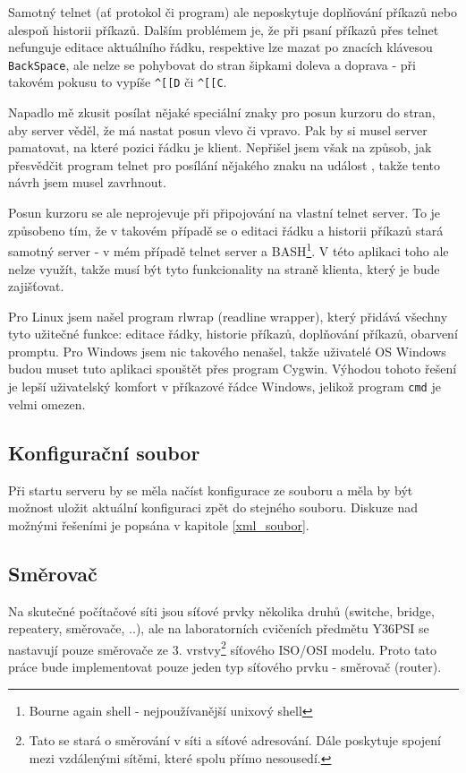 Samotný telnet (ať protokol či program) ale neposkytuje doplňování příkazů nebo alespoň historii příkazů. Dalším problémem je, že při psaní příkazů přes telnet nefunguje editace aktuálního řádku, respektive lze mazat po znacích klávesou \verb|BackSpace|, ale nelze se pohybovat do stran šipkami doleva a doprava - při takovém pokusu to vypíše \verb|^[[D| či \verb|^[[C|. 

Napadlo mě zkusit posílat nějaké speciální znaky pro posun kurzoru do stran, aby server věděl, že má nastat posun vlevo či vpravo. Pak by si musel server pamatovat, na které pozici řádku je klient. Nepřišel jsem však na způsob, jak přesvědčit program telnet pro posílání nějakého znaku na událost , takže tento návrh jsem musel zavrhnout.

Posun kurzoru se ale neprojevuje při připojování na vlastní telnet server. To je způsobeno tím, že v takovém případě se o editaci řádku a historii příkazů stará samotný server - v mém případě telnet server a BASH\footnote{Bourne again shell - nejpoužívanější unixový shell}. V této aplikaci toho ale nelze využít, takže musí být tyto funkcionality na straně klienta, který je bude zajišťovat. 

Pro Linux jsem našel program rlwrap (readline wrapper), který přidává všechny tyto užitečné funkce: editace řádky, historie příkazů, doplňování příkazů, obarvení promptu. Pro Windows jsem nic takového nenašel, takže uživatelé OS Windows budou muset tuto aplikaci spouštět přes program Cygwin. Výhodou tohoto řešení je lepší uživatelský komfort v příkazové řádce Windows, jelikož program \verb|cmd| je velmi omezen.


\subsection{Konfigurační soubor}
Při startu serveru by se měla načíst konfigurace ze souboru a měla by být možnost uložit aktuální konfiguraci zpět do stejného souboru. Diskuze nad možnými řešeními je popsána v kapitole \ref{xml_soubor}.


\subsection{Směrovač}
Na skutečné počítačové síti jsou síťové prvky několika druhů (switche, bridge, repeatery, směrovače, ..), ale na laboratorních cvičeních předmětu Y36PSI se  nastavují pouze směrovače ze 3. vrstvy\footnote{Tato  se stará o směrování v síti a síťové adresování. Dále poskytuje spojení mezi vzdálenými sítěmi, které spolu přímo nesousedí.} síťového ISO/OSI modelu. Proto tato práce bude implementovat pouze jeden typ síťového prvku - směrovač (router). 

